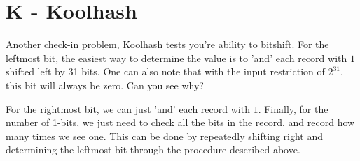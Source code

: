 \documentclass{article}
\begin{document}
\section*{K - Koolhash}
Another check-in problem, Koolhash tests you're ability to bitshift. For the leftmost bit, the easiest way to determine the value is to 'and' each record with $1$ shifted left by 31 bits. One can also note that with the input restriction of $2^{31}$, this bit will always be zero. Can you see why?

\par
For the rightmost bit, we can just 'and' each record with $1$. Finally, for the number of 1-bits, we just need to check all the bits in the record, and record how many times we see one. This can be done by repeatedly shifting right and determining the leftmost bit through the procedure described above.
\end{document}
